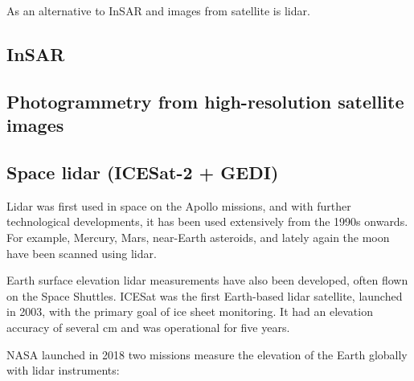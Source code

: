 As an alternative to InSAR and images from satellite is lidar.



\subsection{InSAR}


\subsection{Photogrammetry from high-resolution satellite images}


\subsection{Space lidar (ICESat-2 + GEDI)}

Lidar was first used in space on the Apollo missions, and with further technological developments, it has been used extensively from the 1990s onwards.
For example, Mercury, Mars, near-Earth asteroids, and lately again the moon have been scanned using lidar.

%

Earth surface elevation lidar measurements have also been developed, often flown on the Space Shuttles.
ICESat was the first Earth-based lidar satellite, launched in 2003, with the primary goal of ice sheet monitoring.
It had an elevation accuracy of several cm and was operational for five years.

%

NASA launched in 2018 two missions measure the elevation of the Earth globally with lidar instruments: 

